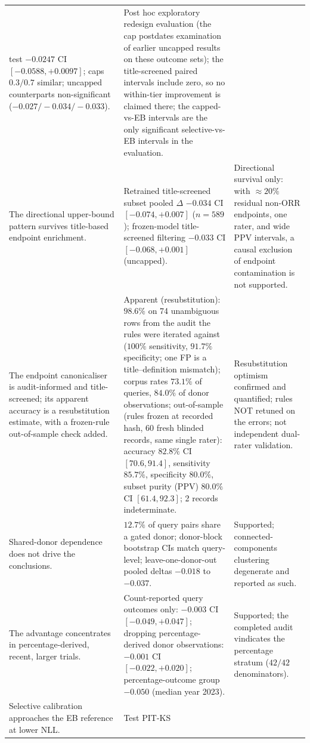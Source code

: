 \documentclass[11pt]{article}
\begin{document}
\begin{longtable}{p{} p{} p{}}
test $-0.0247$ CI
$[-0.0588,+0.0097]$; caps $0.3/0.7$ similar; uncapped counterparts
non-significant ($-0.027/-0.034/-0.033$). & Post hoc exploratory redesign
evaluation (the cap postdates examination of earlier uncapped results on
these outcome sets); the title-screened paired intervals include zero,
so no within-tier improvement is claimed there; the capped-vs-EB
intervals are the only significant selective-vs-EB intervals in
the evaluation. \\
The directional upper-bound pattern survives title-based endpoint
enrichment. &
Retrained title-screened subset pooled $\Delta$ $-0.034$ CI
$[-0.074,+0.007]$ ($n=589$); frozen-model title-screened filtering
$-0.033$ CI $[-0.068,+0.001]$ (uncapped). & Directional survival only:
with $\approx 20\%$ residual non-ORR endpoints, one rater, and wide PPV
intervals, a causal exclusion of endpoint contamination is not
supported. \\
The endpoint canonicaliser is audit-informed and title-screened; its
apparent accuracy is a resubstitution estimate, with a frozen-rule
out-of-sample check added. & Apparent (resubstitution): $98.6\%$ on 74
unambiguous rows from the audit the rules were iterated against ($100\%$
sensitivity, $91.7\%$ specificity; one FP is a title--definition
mismatch); corpus rates $73.1\%$ of queries, $84.0\%$ of donor
observations; out-of-sample (rules frozen at recorded hash, 60 fresh
blinded records, same single rater): accuracy $82.8\%$ CI $[70.6,91.4]$,
sensitivity $85.7\%$, specificity $80.0\%$, subset purity (PPV) $80.0\%$
CI $[61.4,92.3]$; 2 records indeterminate. & Resubstitution optimism
confirmed and quantified; rules NOT retuned on the errors; not
independent dual-rater validation. \\
Shared-donor dependence does not drive the conclusions. & $12.7\%$ of query
pairs share a gated donor; donor-block bootstrap CIs match query-level;
leave-one-donor-out pooled deltas $-0.018$ to $-0.037$. & Supported;
connected-components clustering degenerate and reported as such. \\
The advantage concentrates in percentage-derived, recent, larger trials. &
Count-reported query outcomes only: $-0.003$ CI $[-0.049,+0.047]$; dropping
percentage-derived donor observations: $-0.001$ CI $[-0.022,+0.020]$;
percentage-outcome group $-0.050$ (median year 2023). & Supported; the
completed audit vindicates the percentage stratum ($42/42$ denominators). \\
Selective calibration approaches the EB reference at lower NLL. & Test PIT-KS

\end{longtable}
\end{document}
